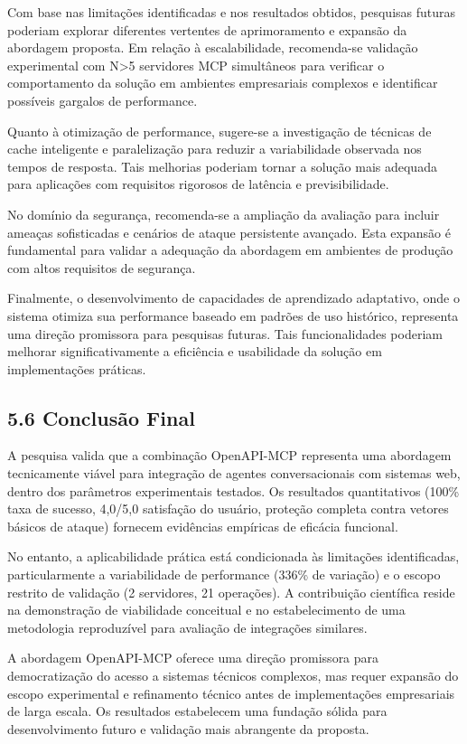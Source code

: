 \documentclass[
]{article}
\begin{document}
Com base nas limitações identificadas e nos resultados obtidos,
pesquisas futuras poderiam explorar diferentes vertentes de
aprimoramento e expansão da abordagem proposta. Em relação à
escalabilidade, recomenda-se validação experimental com N\textgreater5
servidores MCP simultâneos para verificar o comportamento da solução em
ambientes empresariais complexos e identificar possíveis gargalos de
performance.

Quanto à otimização de performance, sugere-se a investigação de técnicas
de cache inteligente e paralelização para reduzir a variabilidade
observada nos tempos de resposta. Tais melhorias poderiam tornar a
solução mais adequada para aplicações com requisitos rigorosos de
latência e previsibilidade.

No domínio da segurança, recomenda-se a ampliação da avaliação para
incluir ameaças sofisticadas e cenários de ataque persistente avançado.
Esta expansão é fundamental para validar a adequação da abordagem em
ambientes de produção com altos requisitos de segurança.

Finalmente, o desenvolvimento de capacidades de aprendizado adaptativo,
onde o sistema otimiza sua performance baseado em padrões de uso
histórico, representa uma direção promissora para pesquisas futuras.
Tais funcionalidades poderiam melhorar significativamente a eficiência e
usabilidade da solução em implementações práticas.

\subsection{5.6 Conclusão Final}\label{conclusuxe3o-final}

A pesquisa valida que a combinação OpenAPI-MCP representa uma abordagem
tecnicamente viável para integração de agentes conversacionais com
sistemas web, dentro dos parâmetros experimentais testados. Os
resultados quantitativos (100\% taxa de sucesso, 4,0/5,0 satisfação do
usuário, proteção completa contra vetores básicos de ataque) fornecem
evidências empíricas de eficácia funcional.

No entanto, a aplicabilidade prática está condicionada às limitações
identificadas, particularmente a variabilidade de performance (336\% de
variação) e o escopo restrito de validação (2 servidores, 21 operações).
A contribuição científica reside na demonstração de viabilidade
conceitual e no estabelecimento de uma metodologia reproduzível para
avaliação de integrações similares.

A abordagem OpenAPI-MCP oferece uma direção promissora para
democratização do acesso a sistemas técnicos complexos, mas requer
expansão do escopo experimental e refinamento técnico antes de
implementações empresariais de larga escala. Os resultados estabelecem
uma fundação sólida para desenvolvimento futuro e validação mais
abrangente da proposta.
\end{document}

